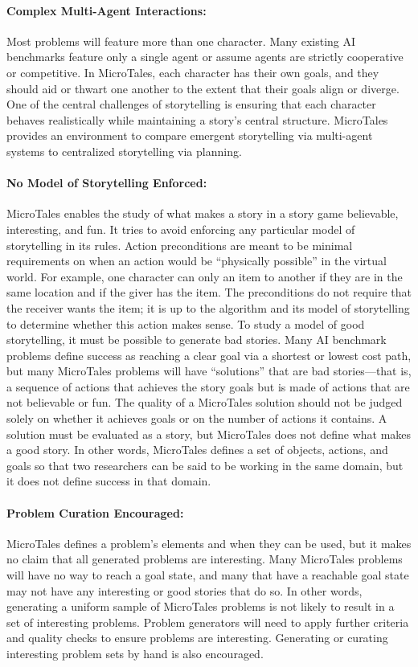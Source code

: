 \documentclass{nilreport}
\begin{document}
\paragraph{Complex Multi-Agent Interactions:} Most problems will feature more than one character. Many existing AI benchmarks feature only a single agent or assume agents are strictly cooperative or competitive. In MicroTales, each character has their own goals, and they should aid or thwart one another to the extent that their goals align or diverge. One of the central challenges of storytelling is ensuring that each character behaves realistically while maintaining a story's central structure. MicroTales provides an environment to compare emergent storytelling via multi-agent systems to centralized storytelling via planning.

\paragraph{No Model of Storytelling Enforced:} MicroTales enables the study of what makes a story in a story game believable, interesting, and fun. It tries to avoid enforcing any particular model of storytelling in its rules. Action preconditions are meant to be minimal requirements on when an action would be ``physically possible'' in the virtual world. For example, one character can only  an item to another if they are in the same location and if the giver has the item. The preconditions do not require that the receiver wants the item; it is up to the algorithm and its model of storytelling to determine whether this action makes sense. To study a model of good storytelling, it must be possible to generate bad stories. Many AI benchmark problems define success as reaching a clear goal via a shortest or lowest cost path, but many MicroTales problems will have ``solutions'' that are bad stories---that is, a sequence of actions that achieves the story goals but is made of actions that are not believable or fun. The quality of a MicroTales solution should not be judged solely on whether it achieves goals or on the number of actions it contains. A solution must be evaluated as a story, but MicroTales does not define what makes a good story. In other words, MicroTales defines a set of objects, actions, and goals so that two researchers can be said to be working in the same domain, but it does not define success in that domain.

\paragraph{Problem Curation Encouraged:} MicroTales defines a problem's elements and when they can be used, but it makes no claim that all generated problems are interesting. Many MicroTales problems will have no way to reach a goal state, and many that have a reachable goal state may not have any interesting or good stories that do so. In other words, generating a uniform sample of MicroTales problems is not likely to result in a set of interesting problems. Problem generators will need to apply further criteria and quality checks to ensure problems are interesting. Generating or curating interesting problem sets by hand is also encouraged.
\end{document}
